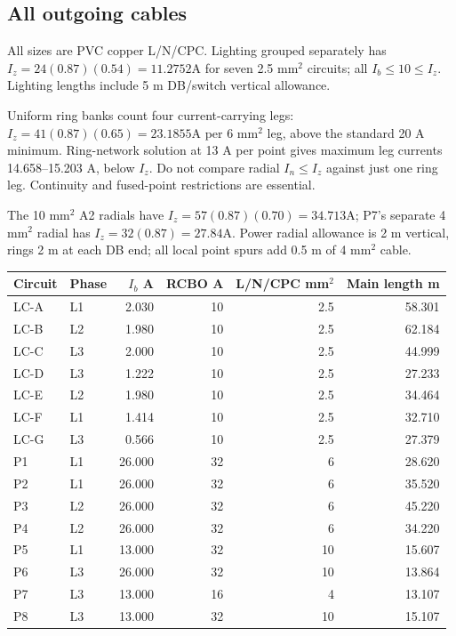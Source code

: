 \subsection*{All outgoing cables}
All sizes are PVC copper L/N/CPC. Lighting grouped separately has $I_z=24(0.87)(0.54)=11.2752$A for seven 2.5 mm$^2$ circuits;  all $I_b\le 10\le I_z$. Lighting lengths include 5 m DB/switch vertical allowance.

Uniform ring banks count four current-carrying legs: $I_z=41(0.87)(0.65)=23.1855$A per 6 mm$^2$ leg, above the standard 20 A minimum. Ring-network solution at 13 A per point gives maximum leg currents 14.658--15.203 A, below $I_z$. Do not compare radial $I_n\le I_z$ against just one ring leg. Continuity and fused-point restrictions are essential.

The 10 mm$^2$ A2 radials have $I_z=57(0.87)(0.70)=34.713$A;  P7's separate 4 mm$^2$ radial has $I_z=32(0.87)=27.84$A. Power radial allowance is 2 m vertical, rings 2 m at each DB end;  all local point spurs add 0.5 m of 4 mm$^2$ cable.
\begin{longtable}{llrrrr}\toprule
Circuit & Phase & $I_b$ A & RCBO A & L/N/CPC mm$^2$ & Main length m\\\midrule\endhead

LC-A & L1 & 2.030 & 10 & 2.5 & 58.301 \\
LC-B & L2 & 1.980 & 10 & 2.5 & 62.184 \\
LC-C & L3 & 2.000 & 10 & 2.5 & 44.999 \\
LC-D & L3 & 1.222 & 10 & 2.5 & 27.233 \\
LC-E & L2 & 1.980 & 10 & 2.5 & 34.464 \\
LC-F & L1 & 1.414 & 10 & 2.5 & 32.710 \\
LC-G & L3 & 0.566 & 10 & 2.5 & 27.379 \\
P1 & L1 & 26.000 & 32 & 6 & 28.620 \\
P2 & L1 & 26.000 & 32 & 6 & 35.520 \\
P3 & L2 & 26.000 & 32 & 6 & 45.220 \\
P4 & L2 & 26.000 & 32 & 6 & 34.220 \\
P5 & L1 & 13.000 & 32 & 10 & 15.607 \\
P6 & L3 & 26.000 & 32 & 10 & 13.864 \\
P7 & L3 & 13.000 & 16 & 4 & 13.107 \\
P8 & L3 & 13.000 & 32 & 10 & 15.107 \\

\bottomrule\end{longtable}
